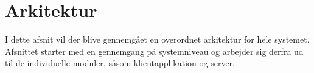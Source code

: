 \chapter{Arkitektur}
I dette afsnit vil der blive gennemgået en overordnet arkitektur for hele systemet. Afsnittet starter med en gennemgang på systemniveau og arbejder sig derfra ud til de individuelle moduler, såsom klientapplikation og server.
